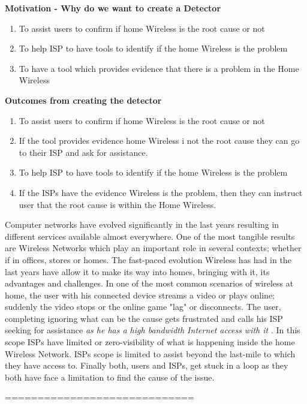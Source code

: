 \textbf{Motivation - Why do we want to create a Detector}

\begin{enumerate}
	\item To assist users to confirm if home Wireless is the root cause or not
	\item To help ISP to have tools to identify if the home Wireless is the problem
	\item To have a tool which provides evidence that there is a problem in the Home Wireless
\end{enumerate}

\textbf{Outcomes from creating the detector}

\begin{enumerate}
	\item To assist users to confirm if home Wireless is the root cause or not
	\item If the tool provides evidence home Wireless i not the root cause they can go to their ISP and ask for assistance.
	\item To help ISP to have tools to identify if the home Wireless is the problem
	\item If the ISPs have the evidence Wireless is the problem, then they can instruct user that the root cause is within the Home Wireless.
\end{enumerate}


Computer networks have evolved significantly in the last years resulting in different services available almost everywhere. One of the most tangible results are Wireless Networks which play an important role in several contexts; whether if in offices, stores or homes. The fast-paced  evolution Wireless has had in the last years have allow it to make its way into homes, bringing with it, its advantages and challenges. In one of the most common scenarios of wireless at home, the user with his connected device streams a video or plays online; suddenly the video stops or the online game "lag" or disconnects. The user, completing ignoring what can be the cause gets frustrated and calls his ISP seeking for assistance \emph{as he has a high bandwidth Internet access with it} . In this scope ISPs have limited or zero-visibility of what is happening inside the home Wireless Network. ISPs scope is limited to assist beyond the last-mile to which they have access to. Finally both, users and ISPs, get stuck in a loop as they both have face a limitation to find the cause of the issue.

=============================

